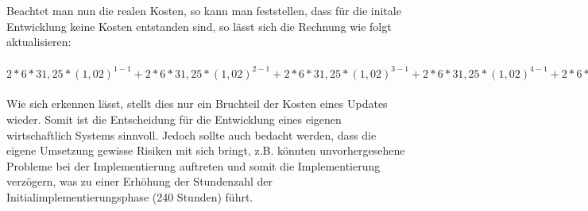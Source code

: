 Beachtet man nun die realen Kosten, so kann man feststellen, dass für die initale Entwicklung keine Kosten entstanden sind, so lässt sich die Rechnung wie folgt aktualisieren:\\
\\
\(2*6*31,25*(1,02)^{1-1}+2*6*31,25*(1,02)^{2-1}+2*6*31,25*(1,02)^{3-1}+2*6*31,25*(1,02)^{4-1}+2*6*31,25*(1,02)^{5-1}=1951,52\text{EUR}\)
\\
\\
Wie sich erkennen lässt, stellt dies nur ein Bruchteil der Kosten eines Updates wieder.
Somit ist die Entscheidung für die Entwicklung eines eigenen wirtschaftlich Systems sinnvoll.
Jedoch sollte auch bedacht werden, dass die eigene Umsetzung gewisse Risiken mit sich bringt, z.B. könnten unvorhergesehene Probleme bei der Implementierung auftreten und somit die Implementierung verzögern, was zu einer Erhöhung der Stundenzahl der Initialimplementierungsphase (240 Stunden) führt.\\
